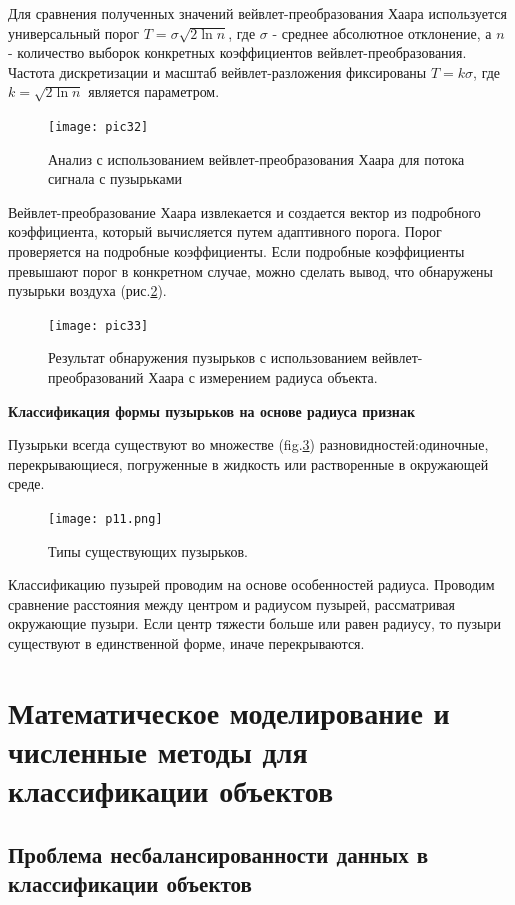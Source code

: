 \documentclass[a4paper,14pt]{extreport}
\begin{document}
Для сравнения полученных значений вейвлет-преобразования Хаара используется универсальный порог $ T = \sigma \sqrt {2 \ln n} $, где $ \sigma $ - среднее абсолютное отклонение, а $ n $ - количество выборок конкретных коэффициентов вейвлет-преобразования. Частота дискретизации и масштаб вейвлет-разложения фиксированы $ T = k \sigma $, где $ k = \sqrt {2 \ln n} $ является параметром.
\begin{figure}[ht!]
\centering
\texttt{[image: pic32]}
\caption{Анализ с использованием вейвлет-преобразования Хаара для потока сигнала с пузырьками}
	\label{pic32}
	\end{figure}

Вейвлет-преобразование Хаара извлекается и создается вектор из подробного коэффициента, который вычисляется путем адаптивного порога. Порог проверяется на подробные коэффициенты. Если подробные коэффициенты превышают порог в конкретном случае, можно сделать вывод, что обнаружены пузырьки воздуха (рис.\ref{pic33}).
\begin{figure}[ht!]
\centering
\texttt{[image: pic33]}
\caption{Результат обнаружения пузырьков с использованием вейвлет-преобразований Хаара с измерением радиуса объекта.}
	\label{pic33}
	\end{figure}

\textbf{Классификация формы пузырьков на основе радиуса признак}

Пузырьки всегда существуют во множестве (fig.\ref{fig11})  разновидностей:одиночные, перекрывающиеся, погруженные в жидкость или растворенные в окружающей среде.
\begin{figure}[ht!]
\centering
\texttt{[image: p11.png]}
\caption{Типы существующих пузырьков.}
	\label{fig11}
	\end{figure}
	
Классификацию пузырей проводим на основе особенностей радиуса. Проводим сравнение расстояния между центром и радиусом пузырей, рассматривая окружающие пузыри. Если центр тяжести больше или равен радиусу, то пузыри существуют в единственной форме, иначе перекрываются.

\section{Математическое моделирование и численные методы для классификации объектов}
\subsection{Проблема несбалансированности данных в классификации объектов}
\end{document}
